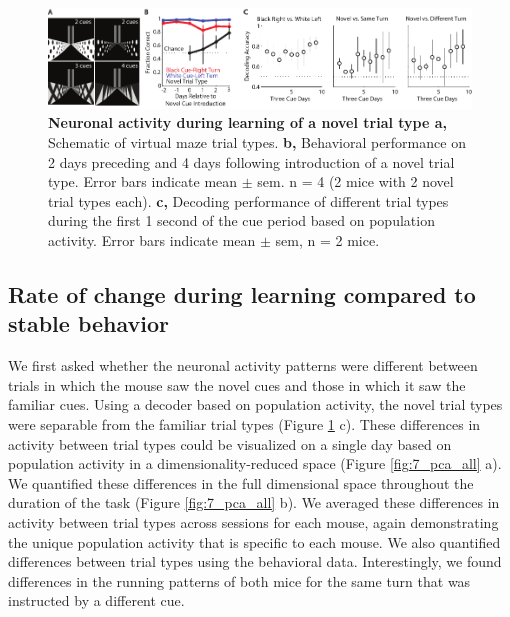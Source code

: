 \begin{figure}
\includegraphics[width=\textwidth]{figures/7_cues.pdf}
\caption[Neuronal activity during learning of a novel trial type]{\textbf{Neuronal activity during learning of a novel trial type a,} Schematic of virtual maze trial types. 
%
\textbf{b,} Behavioral performance on 2 days preceding and 4 days following introduction of a novel trial type. Error bars indicate mean $\pm$ sem. n = 4 (2 mice with 2 novel trial types each).
%
\textbf{c,} Decoding performance of different trial types during the first 1 second of the cue period based on population activity. Error bars indicate mean $\pm$ sem, n = 2 mice. 
\label{fig:7_cues}}
\end{figure}


\subsection{Rate of change during learning compared to stable behavior} \label{chap4:decoding}

We first asked whether the neuronal activity patterns were different between trials in which the mouse saw the novel cues and those in which it saw the familiar cues. Using a decoder based on population activity, the novel trial types were separable from the familiar trial types (Figure \ref{fig:7_cues} c). These differences in activity between trial types could be visualized on a single day based on population activity in a dimensionality-reduced space (Figure \ref{fig:7_pca_all} a). We quantified these differences in the full dimensional space throughout the duration of the task (Figure \ref{fig:7_pca_all} b). We averaged these differences in activity between trial types across sessions for each mouse, again demonstrating the unique population activity that is specific to each mouse. We also quantified differences between trial types using the behavioral data. Interestingly, we found differences in the running patterns of both mice for the same turn that was instructed by a different cue.

